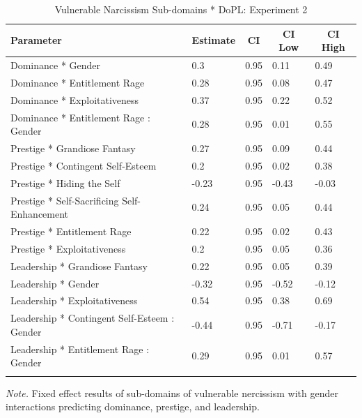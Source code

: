 \documentclass[
  donotrepeattitle,doc, 12pt, a4paper,floatsintext]{apa7}
\begin{document}
\begin{table}[ht]

\begin{center}
\begin{threeparttable}

\caption{\label{tab:dopl-pni-i-int-exp-2}Vulnerable Narcissism Sub-domains * DoPL: Experiment 2}

\begin{tabular}{lllll}
\toprule
Parameter & \multicolumn{1}{c}{Estimate} & \multicolumn{1}{c}{CI} & \multicolumn{1}{c}{CI Low} & \multicolumn{1}{c}{CI High}\\
\midrule
Dominance * Gender & 0.3 & 0.95 & 0.11 & 0.49\\
Dominance * Entitlement Rage & 0.28 & 0.95 & 0.08 & 0.47\\
Dominance * Exploitativeness & 0.37 & 0.95 & 0.22 & 0.52\\
Dominance * Entitlement Rage : Gender & 0.28 & 0.95 & 0.01 & 0.55\\
Prestige * Grandiose Fantasy & 0.27 & 0.95 & 0.09 & 0.44\\
Prestige * Contingent Self-Esteem & 0.2 & 0.95 & 0.02 & 0.38\\
Prestige * Hiding the Self & -0.23 & 0.95 & -0.43 & -0.03\\
Prestige * Self-Sacrificing Self-Enhancement & 0.24 & 0.95 & 0.05 & 0.44\\
Prestige * Entitlement Rage & 0.22 & 0.95 & 0.02 & 0.43\\
Prestige * Exploitativeness & 0.2 & 0.95 & 0.05 & 0.36\\
Leadership * Grandiose Fantasy & 0.22 & 0.95 & 0.05 & 0.39\\
Leadership * Gender & -0.32 & 0.95 & -0.52 & -0.12\\
Leadership * Exploitativeness & 0.54 & 0.95 & 0.38 & 0.69\\
Leadership * Contingent Self-Esteem : Gender & -0.44 & 0.95 & -0.71 & -0.17\\
Leadership * Entitlement Rage : Gender & 0.29 & 0.95 & 0.01 & 0.57\\
\bottomrule
\addlinespace
\end{tabular}

\begin{tablenotes}[para]
\normalsize{\textit{Note.} Fixed effect results of sub-domains of vulnerable nercissism with gender interactions predicting dominance, prestige, and leadership.}
\end{tablenotes}

\end{threeparttable}
\end{center}

\end{table}
\end{document}
